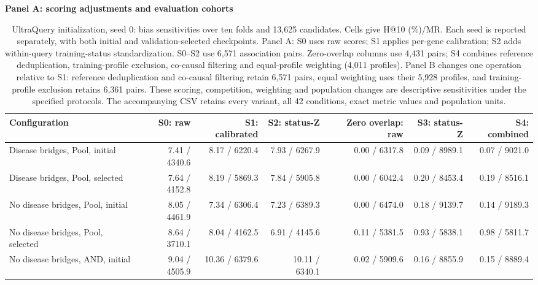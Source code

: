 \begin{landscape}
\begin{table}[p]
\centering\footnotesize
\setlength{\tabcolsep}{3pt}
\caption{UltraQuery initialization, seed 0: bias sensitivities over ten folds and 13,625 candidates. Cells give H@10 (\%)/MR. Each seed is reported separately, with both initial and validation-selected checkpoints. Panel A: S0 uses raw scores; S1 applies per-gene calibration; S2 adds within-query training-status standardization. S0--S2 use 6,571 association pairs. Zero-overlap columns use 4,431 pairs; S4 combines reference deduplication, training-profile exclusion, co-causal filtering and equal-profile weighting (4,011 profiles). Panel B changes one operation relative to S1: reference deduplication and co-causal filtering retain 6,571 pairs, equal weighting uses their 5,928 profiles, and training-profile exclusion retains 6,361 pairs. These scoring, competition, weighting and population changes are descriptive sensitivities under the specified protocols. The accompanying CSV retains every variant, all 42 conditions, exact metric values and population units.}
\label{tab:controlled_bias_ultraquery-seed0}
\textbf{Panel A: scoring adjustments and evaluation cohorts}\par\smallskip
\begin{adjustbox}{max width=\linewidth}
\begin{tabular}{lrrrrrr}
\toprule
Configuration & S0: raw & S1: calibrated & S2: status-Z & Zero overlap: raw & S3: status-Z & S4: combined \\
\midrule
Disease bridges, Pool, initial & 7.41 / 4340.6 & 8.17 / 6220.4 & 7.93 / 6267.9 & 0.00 / 6317.8 & 0.09 / 8989.1 & 0.07 / 9021.0 \\
Disease bridges, Pool, selected & 7.64 / 4152.8 & 8.19 / 5869.3 & 7.84 / 5905.8 & 0.00 / 6042.4 & 0.20 / 8453.4 & 0.19 / 8516.1 \\
No disease bridges, Pool, initial & 8.05 / 4461.9 & 7.34 / 6306.4 & 7.23 / 6389.3 & 0.00 / 6474.0 & 0.18 / 9139.7 & 0.14 / 9189.3 \\
No disease bridges, Pool, selected & 8.64 / 3710.1 & 8.04 / 4162.5 & 6.91 / 4145.6 & 0.11 / 5381.5 & 0.93 / 5838.1 & 0.98 / 5811.7 \\
No disease bridges, AND, initial & 9.04 / 4505.9 & 10.36 / 6379.6 & 10.11 / 6340.1 & 0.02 / 5909.6 & 0.16 / 8855.9 & 0.15 / 8889.4 \\

\end{tabular}
\end{adjustbox}
\end{table}
\end{landscape}
